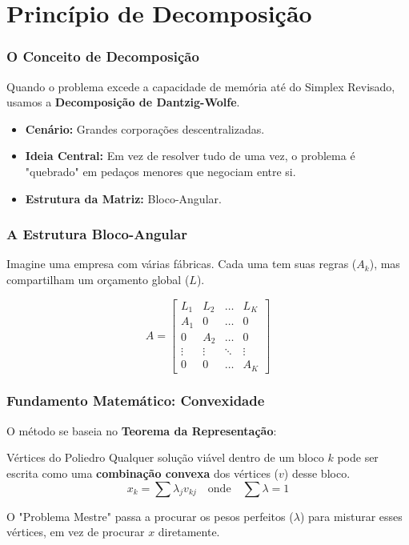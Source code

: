 \section{Princípio de Decomposição}

\begin{frame}
\frametitle{O Conceito de Decomposição}
Quando o problema excede a capacidade de memória até do Simplex Revisado, usamos a \textbf{Decomposição de Dantzig-Wolfe}.
\vspace{0.3cm}
\begin{itemize}
    \item \textbf{Cenário:} Grandes corporações descentralizadas.
    \item \textbf{Ideia Central:} Em vez de resolver tudo de uma vez, o problema é "quebrado" em pedaços menores que negociam entre si.
    \item \textbf{Estrutura da Matriz:} Bloco-Angular.
\end{itemize}
\end{frame}

\begin{frame}
\frametitle{A Estrutura Bloco-Angular}
Imagine uma empresa com várias fábricas. Cada uma tem suas regras ($A_k$), mas compartilham um orçamento global ($L$).

\[
A = \begin{bmatrix}
L_1 & L_2 & \dots & L_K \\ \hline
A_1 & 0 & \dots & 0 \\
0 & A_2 & \dots & 0 \\
\vdots & \vdots & \ddots & \vdots \\
0 & 0 & \dots & A_K
\end{bmatrix}
\]
\end{frame}

\begin{frame}
\frametitle{Fundamento Matemático: Convexidade}
O método se baseia no \textbf{Teorema da Representação}:
\vspace{0.2cm}
\begin{block}{Vértices do Poliedro}
    Qualquer solução viável dentro de um bloco $k$ pode ser escrita como uma \textbf{combinação convexa} dos vértices ($v$) desse bloco.
    \[ x_k = \sum \lambda_{j} v_{kj} \quad \text{onde} \quad \sum \lambda = 1 \]
\end{block}
\vspace{0.2cm}
O "Problema Mestre" passa a procurar os pesos perfeitos ($\lambda$) para misturar esses vértices, em vez de procurar $x$ diretamente.
\end{frame}


